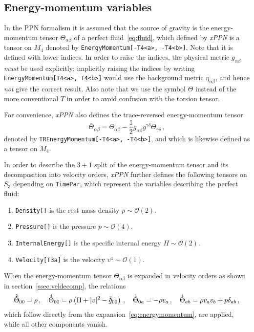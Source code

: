 \documentclass[notitlepage,a4paper,aps,prd,onecolumn,superscriptaddress,nofootinbib,groupedaddress,longbibliography]{revtex4-1}
\newcommand{\order}[2]{\accentset{#2}{#1}}
\newcommand{\xPPN}{\emph{xPPN}}
\begin{document}
\subsection{Energy-momentum variables}\label{ssec:enmomdef}
In the PPN formalism it is assumed that the source of gravity is the energy-momentum tensor \(\Theta_{\alpha\beta}\) of a perfect fluid~\eqref{eq:fluid}, which defined by \xPPN{} is a tensor on \(M_4\) denoted by \lstinline/EnergyMomentum[-T4<a>, -T4<b>]/. Note that it is defined with lower indices. In order to raise the indices, the physical metric \(g_{\alpha\beta}\) \emph{must} be used explicitly; implicitly raising the indices by writing \lstinline/EnergyMomentum[T4<a>, T4<b>]/ would use the background metric \(\eta_{\alpha\beta}\), and hence \emph{not} give the correct result. Also note that we use the symbol \(\Theta\) instead of the more conventional \(T\) in order to avoid confusion with the torsion tensor.

For convenience, \xPPN{} also defines the trace-reversed energy-momentum tensor
\begin{equation}
\bar{\Theta}_{\alpha\beta} = \Theta_{\alpha\beta} - \frac{1}{2}g_{\alpha\beta}g^{\gamma\delta}\Theta_{\gamma\delta}\,,
\end{equation}
denoted by \lstinline/TREnergyMomentum[-T4<a>, -T4<b>]/, and which is likewise defined as a tensor on \(M_4\).

In order to describe the $3+1$ split of the energy-momentum tensor and its decomposition into velocity orders, \xPPN{} further defines the following tensors on \(S_3\) depending on \lstinline/TimePar/, which represent the variables describing the perfect fluid:
\begin{enumerate}
\item
\lstinline/Density[]/ is the rest mass density \(\rho \sim \mathcal{O}(2)\).
\item
\lstinline/Pressure[]/ is the pressure \(p \sim \mathcal{O}(4)\).
\item
\lstinline/InternalEnergy[]/ is the specific internal energy \(\Pi \sim \mathcal{O}(2)\).
\item
\lstinline/Velocity[T3a]/ is the velocity \(v^a \sim \mathcal{O}(1)\).
\end{enumerate}
When the energy-momentum tensor \(\Theta_{\alpha\beta}\) is expanded in velocity orders as shown in section~\ref{ssec:veldecomp}, the relations
\begin{equation}
\order{\Theta}{2}_{00} = \rho\,, \quad
\order{\Theta}{4}_{00} = \rho\left(\Pi + |v|^2 - \order{g}{2}_{00}\right)\,, \quad
\order{\Theta}{3}_{0a} = -\rho v_a\,, \quad
\order{\Theta}{4}_{ab} = \rho v_av_b + p\delta_{ab}\,,
\end{equation}
which follow directly from the expansion~\eqref{eq:energymomentum}, are applied, while all other components vanish.
\end{document}
